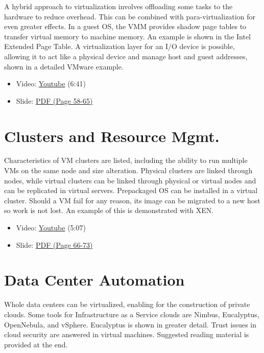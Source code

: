 A hybrid approach to virtualization involves offloading some tasks to
the hardware to reduce overhead. This can be combined with
para-virtualization for even greater effects. In a guest OS, the VMM
provides shadow page tables to transfer virtual memory to machine
memory. An example is shown in the Intel Extended Page Table. A
virtualization layer for an I/O device is possible, allowing it to act
like a physical device and manage host and guest addresses, shown in a
detailed VMware example.

\begin{itemize}
\tightlist
\item
  Video: \href{https://www.youtube.com/watch?v=I_J4eUUavSY}{Youtube}
  (6:41)
\item
  Slide:
  \href{https://drive.google.com/open?id=0B88HKpainTSfQU1uQmxZWHdWQ1k}{PDF
  (Page 58-65)}
\end{itemize}

\section{Clusters and Resource
Mgmt.}\label{clusters-and-resource-mgmt.}

Characteristics of VM clusters are listed, including the ability to run
multiple VMs on the same node and size alteration. Physical clusters are
linked through nodes, while virtual clusters can be linked through
physical or virtual nodes and can be replicated in virtual servers.
Prepackaged OS can be installed in a virtual cluster. Should a VM fail
for any reason, its image can be migrated to a new host so work is not
lost. An example of this is demonstrated with XEN.

\begin{itemize}
\tightlist
\item
  Video: \href{https://www.youtube.com/watch?v=Mn9pgGtFy4g}{Youtube}
  (5:07)
\item
  Slide:
  \href{https://drive.google.com/open?id=0B88HKpainTSfQU1uQmxZWHdWQ1k}{PDF
  (Page 66-73)}
\end{itemize}

\section{Data Center Automation}\label{data-center-automation}

Whole data centers can be virtualized, enabling for the construction of
private clouds. Some tools for Infrastructure as a Service clouds are
Nimbus, Eucalyptus, OpenNebula, and vSphere. Eucalyptus is shown in
greater detail. Trust issues in cloud security are answered in virtual
machines. Suggested reading material is provided at the end.

